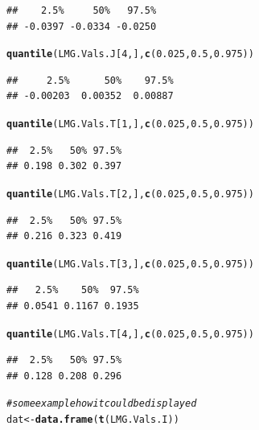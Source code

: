 \documentclass[11pt,a4paper,twoside]{book}\usepackage[]{graphicx}\usepackage[]{color}
\makeatletter
\newcommand{\hlnum}[1]{\textcolor[rgb]{0.686,0.059,0.569}{#1}}%
\newcommand{\hlcom}[1]{\textcolor[rgb]{0.678,0.584,0.686}{\textit{#1}}}%
\newcommand{\hlstd}[1]{\textcolor[rgb]{0.345,0.345,0.345}{#1}}%
\newcommand{\hlkwb}[1]{\textcolor[rgb]{0.69,0.353,0.396}{#1}}%
\newcommand{\hlkwd}[1]{\textcolor[rgb]{0.737,0.353,0.396}{\textbf{#1}}}%
\newenvironment{kframe}{%
 \def\at@end@of@kframe{}%
 \ifinner\ifhmode%
  \def\at@end@of@kframe{\end{minipage}}%
  \begin{minipage}{\columnwidth}%
 \fi\fi%
 \def\FrameCommand##1{\hskip\@totalleftmargin \hskip-\fboxsep
 \colorbox{shadecolor}{##1}\hskip-\fboxsep
     \hskip-\linewidth \hskip-\@totalleftmargin \hskip\columnwidth}%
 \MakeFramed {\advance\hsize-\width
   \@totalleftmargin\z@ \linewidth\hsize
   \@setminipage}}%
 {\par\unskip\endMakeFramed%
 \at@end@of@kframe}
\newenvironment{knitrout}{}{} %
\makeatother
\begin{document}
\begin{knitrout}
\begin{kframe}
\begin{alltt}
\end{alltt}
\begin{verbatim}
##    2.5%     50%   97.5% 
## -0.0397 -0.0334 -0.0250
\end{verbatim}
\begin{alltt}
\hlkwd{quantile}\hlstd{(LMG.Vals.J[}\hlnum{4}\hlstd{,],} \hlkwd{c}\hlstd{(}\hlnum{0.025}\hlstd{,} \hlnum{0.5}\hlstd{,} \hlnum{0.975}\hlstd{))}
\end{alltt}
\begin{verbatim}
##     2.5%      50%    97.5% 
## -0.00203  0.00352  0.00887
\end{verbatim}
\begin{alltt}
\hlkwd{quantile}\hlstd{(LMG.Vals.T[}\hlnum{1}\hlstd{,],} \hlkwd{c}\hlstd{(}\hlnum{0.025}\hlstd{,} \hlnum{0.5}\hlstd{,} \hlnum{0.975}\hlstd{))}
\end{alltt}
\begin{verbatim}
##  2.5%   50% 97.5% 
## 0.198 0.302 0.397
\end{verbatim}
\begin{alltt}
\hlkwd{quantile}\hlstd{(LMG.Vals.T[}\hlnum{2}\hlstd{,],} \hlkwd{c}\hlstd{(}\hlnum{0.025}\hlstd{,} \hlnum{0.5}\hlstd{,} \hlnum{0.975}\hlstd{))}
\end{alltt}
\begin{verbatim}
##  2.5%   50% 97.5% 
## 0.216 0.323 0.419
\end{verbatim}
\begin{alltt}
\hlkwd{quantile}\hlstd{(LMG.Vals.T[}\hlnum{3}\hlstd{,],} \hlkwd{c}\hlstd{(}\hlnum{0.025}\hlstd{,} \hlnum{0.5}\hlstd{,} \hlnum{0.975}\hlstd{))}
\end{alltt}
\begin{verbatim}
##   2.5%    50%  97.5% 
## 0.0541 0.1167 0.1935
\end{verbatim}
\begin{alltt}
\hlkwd{quantile}\hlstd{(LMG.Vals.T[}\hlnum{4}\hlstd{,],} \hlkwd{c}\hlstd{(}\hlnum{0.025}\hlstd{,} \hlnum{0.5}\hlstd{,} \hlnum{0.975}\hlstd{))}
\end{alltt}
\begin{verbatim}
##  2.5%   50% 97.5% 
## 0.128 0.208 0.296
\end{verbatim}
\begin{alltt}
\hlcom{# some example how it could be displayed}
\hlstd{dat} \hlkwb{<-} \hlkwd{data.frame}\hlstd{(}\hlkwd{t}\hlstd{(LMG.Vals.I))}


\end{alltt}
\end{kframe}
\end{knitrout}
\end{document}
